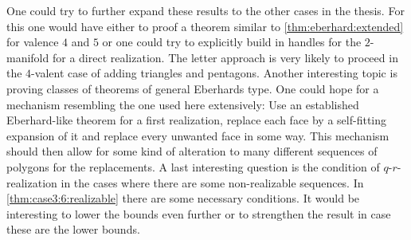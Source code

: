 One could try to further expand these results to the other cases in the thesis. For this one would have either to proof a theorem similar to \autoref{thm:eberhard:extended} for valence $4$ and $5$ or one could try to explicitly build in handles for the $2$-manifold for a direct realization. The letter approach is very likely to proceed in the $4$-valent case of adding triangles and pentagons. Another interesting topic is proving classes of theorems of general Eberhards type. One could hope for a mechanism resembling the one used here extensively: Use an established Eberhard-like theorem for a first realization, replace each face by a self-fitting expansion of it and replace every unwanted face in some way. This mechanism should then allow for some kind of alteration to many different sequences of polygons for the replacements. A last interesting question is the condition of $q$-$r$-realization in the cases where there are some non-realizable sequences. In \autoref{thm:case3:6:realizable} there are some necessary conditions. It would be interesting to lower the bounds even further or to strengthen the result in case these are the lower bounds.